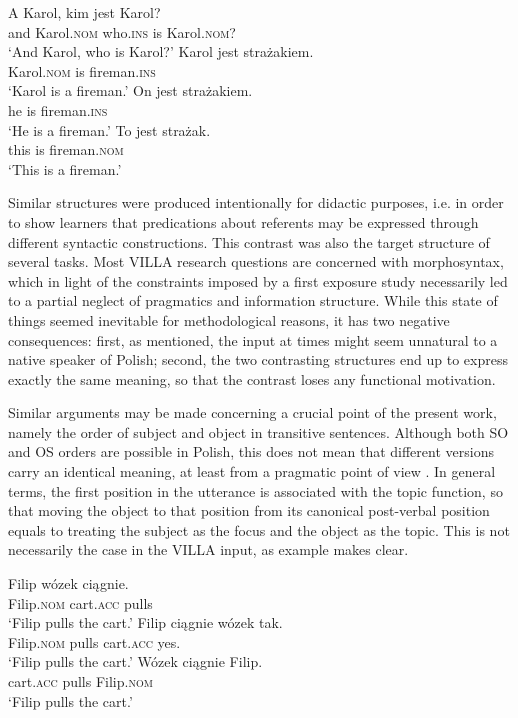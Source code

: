 \ea%
    \label{ex:02:2}
    \ea\label{ex:02:2a}
    \gll    A Karol, kim jest Karol?\\
            and Karol.\textsc{nom} who.\textsc{ins} is Karol.\textsc{nom}?\\
    \glt    ‘And Karol, who is Karol?’
    \ex\label{ex:02:2b}
    \gll    Karol jest stra\.{z}akiem.\\
            Karol.\textsc{nom} is fireman.\textsc{ins}\\
    \glt    ‘Karol is a fireman.’
    \ex\label{ex:02:2c}
    \gll    On jest stra\.{z}akiem.\\
            he is fireman.\textsc{ins}\\
    \glt    ‘He is a fireman.’
    \ex\label{ex:02:2d}
    \gll    To jest stra\.{z}ak.\\
            this is fireman.\textsc{nom}\\
    \glt    ‘This is a fireman.’
    \z
\z

Similar structures were produced intentionally for didactic purposes, i.e. in order to show learners that predications about referents may be expressed through different syntactic constructions. This contrast was also the target structure of several tasks. Most VILLA research questions are concerned with morphosyntax, which in light of the constraints imposed by a first exposure study necessarily led to a partial neglect of pragmatics and information structure. While this state of things seemed inevitable for methodological reasons, it has two negative consequences: first, as mentioned, the input at times might seem unnatural to a native speaker of Polish; second, the two contrasting structures end up to express exactly the same meaning, so that the contrast loses any functional motivation.

Similar arguments may be made concerning a crucial point of the present work, namely the order of subject and object in transitive sentences. Although both SO and OS orders are possible in Polish, this does not mean that different versions carry an identical meaning, at least from a pragmatic point of view \citep{Siewierska1993}. In general terms, the first position in the utterance is associated with the topic function, so that moving the object to that position from its canonical post-verbal position equals to treating the subject as the focus and the object as the topic. This is not necessarily the case in the VILLA input, as example  makes clear.

\ea%
    \label{ex:02:3}
    \ea\label{ex:02:3a}
    \gll    Filip wózek ciągnie.\\
            Filip.\textsc{nom} cart.\textsc{acc} pulls\\
    \glt    ‘Filip pulls the cart.’
    \ex\label{ex:02:3b}
    \gll    Filip ciągnie wózek tak.\\
            Filip.\textsc{nom} pulls cart.\textsc{acc} yes.\\
    \glt    ‘Filip pulls the cart.’
    \ex\label{ex:02:3c}
    \gll    Wózek ciągnie Filip.\\
            cart.\textsc{acc} pulls Filip.\textsc{nom}\\
    \glt    ‘Filip pulls the cart.’
    \z
\z

